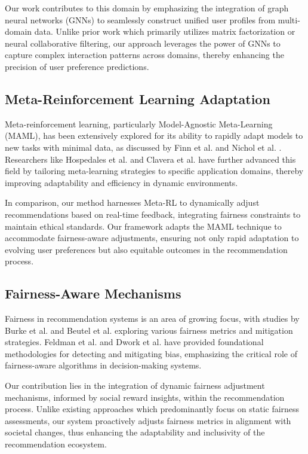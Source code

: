 \documentclass{article} %
\begin{document}
Our work contributes to this domain by emphasizing the integration of graph neural networks (GNNs) to seamlessly construct unified user profiles from multi-domain data. Unlike prior work which primarily utilizes matrix factorization or neural collaborative filtering, our approach leverages the power of GNNs to capture complex interaction patterns across domains, thereby enhancing the precision of user preference predictions.

\subsection{Meta-Reinforcement Learning Adaptation}

Meta-reinforcement learning, particularly Model-Agnostic Meta-Learning (MAML), has been extensively explored for its ability to rapidly adapt models to new tasks with minimal data, as discussed by Finn et al. \citep{finn2017model} and Nichol et al. \citep{nichol2018first}. Researchers like Hospedales et al. \citep{hospedales2021meta} and Clavera et al. \citep{clavera2018learning} have further advanced this field by tailoring meta-learning strategies to specific application domains, thereby improving adaptability and efficiency in dynamic environments.

In comparison, our method harnesses Meta-RL to dynamically adjust recommendations based on real-time feedback, integrating fairness constraints to maintain ethical standards. Our framework adapts the MAML technique to accommodate fairness-aware adjustments, ensuring not only rapid adaptation to evolving user preferences but also equitable outcomes in the recommendation process.

\subsection{Fairness-Aware Mechanisms}

Fairness in recommendation systems is an area of growing focus, with studies by Burke et al. \citep{burke2018balanced} and Beutel et al. \citep{beutel2019fairness} exploring various fairness metrics and mitigation strategies. Feldman et al. \citep{feldman2015certifying} and Dwork et al. \citep{dwork2012fairness} have provided foundational methodologies for detecting and mitigating bias, emphasizing the critical role of fairness-aware algorithms in decision-making systems.

Our contribution lies in the integration of dynamic fairness adjustment mechanisms, informed by social reward insights, within the recommendation process. Unlike existing approaches which predominantly focus on static fairness assessments, our system proactively adjusts fairness metrics in alignment with societal changes, thus enhancing the adaptability and inclusivity of the recommendation ecosystem.
\end{document}
